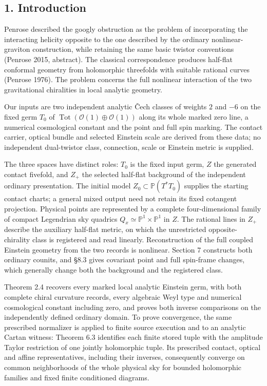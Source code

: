 \documentclass[
  english,
  11pt,
  reqno]{amsart}
\begin{document}
\protect{}\label{sec:gg-introduction}

\subsection{1. Introduction}\label{introduction}

Penrose described the googly obstruction as the problem of incorporating
the interacting helicity opposite to the one described by the ordinary
nonlinear-graviton construction, while retaining the same basic twistor
conventions (Penrose 2015, abstract). The classical correspondence
produces half-flat conformal geometry from holomorphic threefolds with
suitable rational curves (Penrose 1976). The problem concerns the full
nonlinear interaction of the two gravitational chiralities in local
analytic geometry.

Our inputs are two independent analytic Čech classes of weights \(2\)
and \(-6\) on the fixed germ \(T_0\) of
\(\operatorname{Tot}(\mathcal O(1)\oplus\mathcal O(1))\) along its whole
marked zero line, a numerical cosmological constant and the point and
full spin marking. The contact carrier, optical bundle and selected
Einstein scale are derived from these data; no independent dual-twistor
class, connection, scale or Einstein metric is supplied.

The three spaces have distinct roles: \(T_0\) is the fixed input germ,
\(Z\) the generated contact fivefold, and \(Z_+\) the selected half-flat
background of the independent ordinary presentation. The initial model
\(Z_0\subset\mathbb P(T^*T_0)\) supplies the starting contact charts; a
general mixed output need not retain its fixed cotangent projection.
Physical points are represented by a complete four-dimensional family of
compact Legendrian sky quadrics
\(Q_x\simeq\mathbb P^1\times\mathbb P^1\) in \(Z\). The rational lines
in \(Z_+\) describe the auxiliary half-flat metric, on which the
unrestricted opposite-chirality class is registered and read linearly.
Reconstruction of the full coupled Einstein geometry from the two
records is nonlinear. Section 7 constructs both ordinary counits, and
§8.3 gives covariant point and full spin-frame changes, which generally
change both the background and the registered class.

Theorem 2.4 recovers every marked local analytic Einstein germ, with
both complete chiral curvature records, every algebraic Weyl type and
numerical cosmological constant including zero, and proves both inverse
comparisons on the independently defined ordinary domain. To prove
convergence, the same prescribed normalizer is applied to finite source
execution and to an analytic Cartan witness: Theorem 6.3 identifies each
finite stored tuple with the amplitude Taylor restriction of one jointly
holomorphic tuple. Its prescribed contact, optical and affine
representatives, including their inverses, consequently converge on
common neighborhoods of the whole physical sky for bounded holomorphic
families and fixed finite conditioned diagrams.
\end{document}
